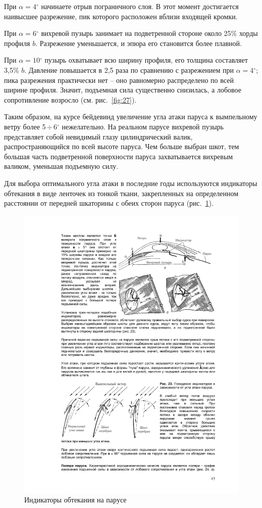 \documentclass[a4paper, 12pt, twoside, final, book, russian, fittopage, cyremdash]{ncc}
\newcommand{\gr}{\ensuremath{^\circ}\xspace}
\newcommand{\otdo}{\,\ensuremath{\div}\,}
\newcommand{\ris}[1]{\ref{fig:#1}}
\begin{document}
При $\alpha = 4\gr$ начинаете отрыв пограничного слоя. В этот момент достигается наивысшее разрежение, пик которого расположен вблизи входящей кромки.
 
При $\alpha = 6\gr$ вихревой пузырь занимает на подветренной стороне около 25\% хорды профиля $b$. Разрежение уменьшается, и эпюра его становится более плавной. 

При $\alpha = 10\gr$ пузырь охватывает всю ширину профиля, его толщина составляет 3,5\% $b$. Давление повышается в 2,5 раза по сравнению с разрежением при $\alpha = 4\gr$; пика разрежения практически нет \--- оно равномерно распределено по всей ширине профиля. Значит, подъемная сила существенно снизилась, а лобовое сопротивление возросло (см. рис.~\ris{27}). 

Таким образом, на курсе бейдевинд увеличение угла атаки паруса к вымпельному ветру более 5\otdo 6\gr нежелательно. На реальном парусе вихревой пузырь представляет собой невидимый глазу цилиндрический валик, распространяющийся по всей высоте паруса. Чем больше выбран шкот, тем большая часть подветренной поверхности паруса захватывается вихревым валиком, уменьшая подъемную силу. 

Для выбора оптимального угла атаки в последние годы используются индикаторы обтекания в виде ленточек из тонкой ткани, закрепленных на определенном расстоянии от передней шкаторины с обеих сторон паруса (рис.~\ris{22}).

\begin{figure}[htb]
  \centering
  \includegraphics[scale=1]{0022}
  \caption{Индикаторы обтекания на парусе}
  \label{fig:22}
\end{figure}
\end{document}
